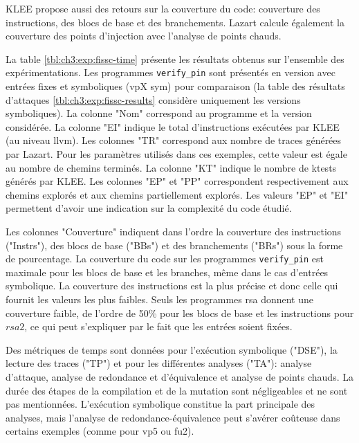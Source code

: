                 KLEE propose aussi des retours sur la couverture du code: couverture des instructions, des blocs de base et des branchements.
                Lazart calcule également la couverture des points d'injection avec l'analyse de points chauds.
                
                La table \ref{tbl:ch3:exp:fissc-time} présente les résultats obtenus sur l'ensemble des expérimentations.
                Les programmes \texttt{verify\_pin} sont présentés en version avec entrées fixes et symboliques (vpX sym) pour comparaison (la table des résultats d'attaques \ref{tbl:ch3:exp:fissc-results} considère uniquement les versions symboliques).
                La colonne "Nom" correspond au programme et la version considérée.
                La colonne "EI" indique le total d'instructions exécutées par KLEE (au niveau \gls{llvm}).
                Les colonnes "TR" correspond aux nombre de traces générées par Lazart. Pour les paramètres utilisés dans ces exemples, cette valeur est égale au nombre de chemins terminés.
                La colonne "KT" indique le nombre de ktests générés par KLEE.
                Les colonnes "EP" et "PP" correspondent respectivement aux chemins explorés et aux chemins partiellement explorés.
                Les valeurs "EP" et "EI" permettent d'avoir une indication sur la complexité du code étudié.
                
                Les colonnes "Couverture" indiquent dans l'ordre la couverture des instructions ("Instrs"), des blocs de base ("BBs") et des branchements ("BRs") sous la forme de pourcentage.
                La couverture du code sur les programmes \texttt{verify\_pin} est maximale pour les blocs de base et les branches, même dans le cas d'entrées symbolique. La couverture des instructions est la plus précise et donc celle qui fournit les valeurs les plus faibles. Seuls les programmes \gls{rsa} donnent une couverture faible, de l'ordre de 50\% pour les blocs de base et les instructions pour $rsa2$, ce qui peut s'expliquer par le fait que les entrées soient fixées.
                
                Des métriques de temps sont données pour l'exécution symbolique ("DSE"), la lecture des traces ("TP") et pour les différentes analyses ("TA"): analyse d'attaque, analyse de redondance et d'équivalence et analyse de points chauds.
                La durée des étapes de la compilation et de la mutation sont négligeables et ne sont pas mentionnées.
                L'exécution symbolique constitue la part principale des analyses, mais l'analyse de redondance-équivalence peut s'avérer coûteuse dans certains exemples (comme pour vp5 ou fu2).
                
